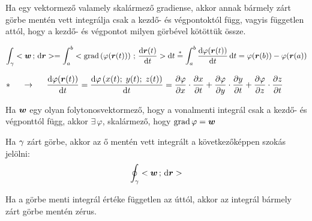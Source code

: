 \documentclass[main.tex]{subfiles}
\begin{document}

Ha egy vektormező valamely skalármező gradiense,
akkor annak bármely zárt görbe mentén vett integrálja
csak a kezdő- és végpontoktól függ,
vagyis független attól, hogy a kezdő- és végpontot
milyen görbével kötöttük össze.

\begin{equation*}
  \int_{\rcurve{\gamma}} \scalar{\rvec{w}}{\differential \rvec{r}}
  = \int_a^b \scalar{\grad \left( \varphi(\rvec{r}(t)) \right)}
  {\derivative{\rvec{r}(t)}{t}} \differential t
  \overset{*}{=} \int_a^b \derivative{\varphi(\rvec{r}(t))}{t} \, \differential t
  = \varphi(\rvec{r}(b)) - \varphi(\rvec{r}(a))
\end{equation*}

\begin{equation*}
  * \hspace{5mm} \rightarrow \hspace{5mm}
  \derivative{\varphi(\rvec{r}(t))}{t}
  = \derivative{\varphi\left(
    x(t) ; \; y(t) ; \; z(t)
    \right)}{t}
  = \partialderivative{\varphi}{x} \cdot \partialderivative{x}{t}
  + \partialderivative{\varphi}{y} \cdot \partialderivative{y}{t}
  + \partialderivative{\varphi}{z} \cdot \partialderivative{z}{t}
  \hspace{10mm}
\end{equation*}



Ha $\boldsymbol{w}$ egy olyan folytonosvektormező,
hogy a vonalmenti integrál csak a kezdő- és
végponttól függ, akkor $\exists \, \varphi$,
skalármező, hogy $\operatorname{grad} \varphi = \boldsymbol{w}$




Ha ${\gamma}$ zárt görbe, akkor az ő mentén vett integrált
a következőképpen szokás jelölni:
\begin{equation*}
  \oint_{{\gamma}} < \boldsymbol{w} \, ; \, \mathrm{d} \boldsymbol{r} >
\end{equation*}




Ha a görbe menti integrál értéke független az úttól,
akkor az integrál bármely zárt görbe mentén zérus.



\end{document}
